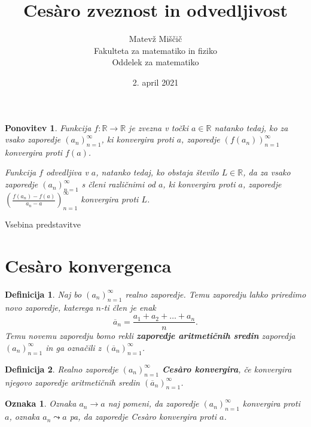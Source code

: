 \documentclass[10pt,hyperref={unicode}]{beamer}
\title{Ces\`{a}ro zveznost in odvedljivost}
\author{Matevž Miščič \\
Fakulteta za matematiko in fiziko \\
Oddelek za matematiko}
\date{2. april 2021}
\newtheorem{definicija}{Definicija}
\newtheorem{ponovitev}{Ponovitev}
\newtheorem{oznaka}{Oznaka}
\begin{document}
    
\begin{frame}
    \titlepage
\end{frame}

\begin{frame}
    \begin{ponovitev}
        Funkcija $f: \mathbb{R} \rightarrow \mathbb{R}$ je zvezna v točki $a \in \mathbb{R}$ natanko tedaj, ko za vsako zaporedje $(a_n)_{n=1}^{\infty}$, ki konvergira proti $a$, zaporedje $(f(a_n))_{n=1}^{\infty}$ konvergira proti $f(a)$.
        \pause
        
        \medskip
        Funkcija $f$ odvedljiva v $a$, natanko tedaj, ko obstaja število $L \in \mathbb{R}$, da za vsako zaporedje $(a_n)_{n=1}^{\infty}$ s členi različnimi od $a$, ki konvergira proti $a$, zaporedje $\left(\frac{f(a_n)-f(a)}{a_n-a}\right)_{n=1}^{\infty}$ konvergira proti $L$.
    \end{ponovitev}
\end{frame}

\begin{frame}{Vsebina predstavitve}
    \tableofcontents
\end{frame}



\section{Ces\`{a}ro konvergenca}

\begin{frame}
    \begin{definicija}
        Naj bo $(a_n)_{n=1}^{\infty}$ realno zaporedje. Temu zaporedju lahko priredimo novo zaporedje, katerega $n$-ti člen je enak 
        $$\overline{a}_n = \frac{a_1+a_2+\ldots+a_n}{n}.$$ 
        Temu novemu zaporedju bomo rekli \textbf{zaporedje aritmetičnih sredin} zaporedja $(a_n)_{n=1}^{\infty}$ in ga označili z $(\overline{a}_n)_{n=1}^{\infty}$.
    \end{definicija}
    \pause
    \begin{definicija}
        Realno zaporedje $(a_n)_{n=1}^{\infty}$ \textbf{Ces\`{a}ro konvergira}, če konvergira njegovo zaporedje aritmetičnih sredin $(\overline{a}_n)_{n=1}^{\infty}$.
    \end{definicija}
    \pause
    \begin{oznaka}
        Oznaka $a_n \rightarrow a$ naj pomeni, da zaporedje $(a_n)_{n=1}^{\infty}$ konvergira proti $a$, oznaka $a_n \leadsto a$ pa, da zaporedje Ces\`{a}ro konvergira proti $a$. 
    \end{oznaka}
\end{frame}
\end{document}
